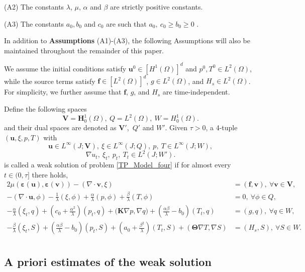 \documentclass{article}
\numberwithin{equation}{section}
\begin{document}
(A2) The constants \(\lambda\), \(\mu\), \(\alpha\) and \(\beta\) are strictly positive constants.

(A3) The constants $a_0,b_0 $ and $c_0$ are such that $a_0,~ c_0 \ge b_0 \ge 0$ .

In addition to \textbf{Assumptions} (A1)-(A3), the following Assumptions will also be maintained throughout the remainder of this paper. 

We assume the initial conditions satisfy \(\bm{u}^0 \in [H^1(\Omega)]^d\) and \(p^0, T^0 \in L^2(\Omega)\), while the source terms satisfy \(\bm{f} \in [L^2(\Omega)]^d\), \(g \in L^2(\Omega)\), and \( H_{s} \in L^2(\Omega)\). For simplicity, we further assume that \(\bm{f}\), \(g\), and \( H_{s}\) are time-independent.

 

Define the following spaces
$$
\bm V=\bm H^1_0(\Omega),~Q=L^2(\Omega),~W=H_0^1(\Omega). 
$$
and their dual spaces are denoted as  $\bm V'$,~$Q'$ and $W'$.  
Given $\tau>0$, a 4-tuple $(\bm u,\xi,p,T)$ with
$$
\bm u\in L^\infty(J;\bm V),~\xi\in L^\infty(J; Q),~p,~T\in L^\infty(J; W), 
$$
$$
\nabla u_t, ~\xi_t, ~p_t, ~T_t\in L^2(J;  W').
$$
is called a weak solution of problem \eqref{TP_Model_four} if for almost every $t\in (0, \tau]$ there holds,
\begin{equation}\label{TP_Model_var}
\begin{aligned} 
2\mu(\bm\varepsilon(\bm u), \bm\varepsilon(\bm v)) - (\nabla\cdot\bm v,\xi)&=(\bm f,\bm v)       ,~\forall \bm v\in\bm V,  \\
  -(\nabla\cdot\bm u,\phi)-\frac{1}{\lambda}(\xi,\phi)+\frac{\alpha}{\lambda}(p,\phi)+\frac{\beta}{\lambda}(T,\phi)&=0 ,~\forall\phi\in Q,\\
 -\frac\alpha\lambda( \xi_t ,q)+(c_0+\frac{\alpha^2}{\lambda})( p_t ,q)+\bm (\bm K\nabla p,\nabla q)+ (\frac{\alpha\beta}{\lambda}-b_0)( T_t ,q)
                &=(g,q),~\forall q\in W,\\
 -\frac\beta\lambda( \xi_t ,S)+(\frac{\alpha\beta}{\lambda}-b_0)( p_t ,S)+(a_0+\frac{\beta^2}{\lambda})( T_t ,S)   
  +(\bm\Theta\nabla T,\nabla S)&=( H_{s},S), ~\forall S\in W.\\
\end{aligned}
\end{equation}  
 

\subsection{A priori estimates of the weak solution}
\end{document}
